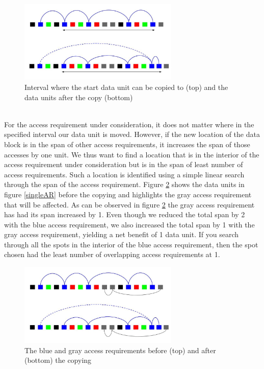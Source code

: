 \begin{figure}[ht]
\centering
\includegraphics[width=3in]{SingleAR_afterCopy.jpg}
\caption{Interval where the start data unit can be copied to (top) and the data
units after the copy (bottom)
}
\label{singleARafterCopy}
\end{figure}
\\
For the access requirement under consideration, it does not matter where in the specified interval our data unit is moved. However, if the new location of the data block is in the span of other access requirements, it increases the span of those accesses by one unit. We thus want to find a location that is in the interior of the access requirement under consideration but is in the span of least number of access requirements. Such a location is identified using a simple linear search through the span of the access requirement. Figure \ref{singleARafterCopyOtherAR} shows the data units in figure \ref{singleAR} before the copying and highlights the gray access requirement that will be affected. As can be observed in figure \ref{singleARafterCopyOtherAR} the gray access requirement has had its span increased by 1. Even though we reduced the total span by 2 with the blue access requirement, we also increased the total span by 1 with the gray access requirement, yielding a net benefit of 1 data unit. If you search through all the spots in the interior of the blue access requirement, then the spot chosen had the least number of overlapping access requirements at 1.\\

\begin{figure}[ht]
\centering
\includegraphics[width=3in]{SingleAR_afterCopy_otherARnoted.jpg}
\caption{The blue and gray access requirements before (top) and after (bottom) the copying}
\label{singleARafterCopyOtherAR}
\end{figure}

